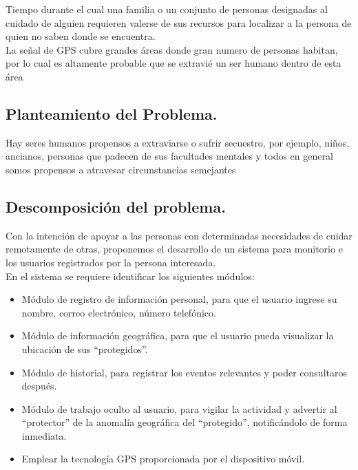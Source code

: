 Tiempo durante el cual una familia o un conjunto de personas designadas al cuidado de alguien requieren valerse de sus recursos para localizar a la persona de quien no saben donde se encuentra. \\

La señal de GPS cubre grandes áreas donde gran numero de personas habitan, por lo cual es altamente probable que se extravié un ser humano dentro de esta área   \\

\subsection{Planteamiento del Problema.} 
Hay seres humanos propensos a extraviarse o sufrir secuestro, por ejemplo, niños, ancianos, personas que padecen de sus facultades mentales y todos en general somos propensos a atravesar circunstancias semejantes \\


\subsection{Descomposición del problema.}
Con la intención de apoyar a las personas con determinadas necesidades de cuidar remotamente de otras, proponemos el desarrollo de un sistema para monitorio e los usuarios registrados por la persona interesada.\\

En el sistema se requiere identificar los siguientes módulos: \\
\begin{itemize}
\item Módulo de registro de información personal, para que el usuario ingrese su nombre, correo electrónico, número telefónico.
\item Módulo de información geográfica, para que el usuario pueda visualizar la ubicación de sus “protegidos”.
\item Módulo de historial, para registrar los eventos relevantes y poder consultaros después.  
\item Módulo de trabajo oculto al usuario, para vigilar la actividad y advertir  al “protector” de la anomalía geográfica del “protegido”, notificándolo de forma inmediata.
\item Emplear la tecnología GPS proporcionada por el dispositivo móvil. \\

\end{itemize}

